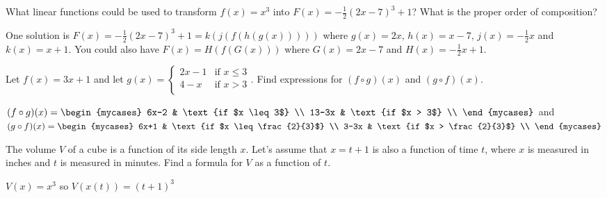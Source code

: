 \documentclass{ximera}
\begin{document}
\begin{problem}
What linear functions could be used to transform $f(x) = x^{3}$ into $F(x) = -\frac{1}{2}(2x - 7)^{3} + 1$?  What is the proper order of composition?

\begin{solution}
One solution is $F(x) = -\frac{1}{2}(2x - 7)^{3} + 1 = k(j(f(h(g(x)))))$ where $g(x) = 2x, \, h(x) = x - 7, \, j(x) = -\frac{1}{2}x$ and $k(x) = x + 1$.  You could also have $F(x) = H(f(G(x)))$ where $G(x) = 2x - 7$ and $H(x) = -\frac{1}{2}x + 1$.

\end{solution}
\end{problem}

\begin{problem}
Let $f(x) = 3x+1$ and let $g(x) =    \begin{cases}  2x-1 &  \text{if $x \leq 3$} \\   4-x & \text{if $x > 3$} \\  \end{cases}$.  Find expressions for $(f \circ g)(x)$ and $(g \circ f)(x)$.

\begin{solution}
    $(f \circ g)(x) =    \begin{mycases} 6x-2 &  \text{if $x \leq 3$} \\   13-3x  & \text{if $x > 3$} \\  \end{mycases}$ and $(g \circ f)(x) =    \begin{mycases} 6x+1 &  \text{if $x \leq \frac{2}{3}$} \\   3-3x  & \text{if $x > \frac{2}{3}$} \\  \end{mycases}$
\end{solution}

\end{problem}

\begin{problem}
The volume $V$ of a cube is a function of its side length $x$.  Let's assume that $x = t + 1$ is also a function of time $t$, where $x$ is measured in inches and $t$ is measured in minutes.  Find a formula for $V$ as a function of $t$.

\begin{solution}
    $V(x) = x^{3}$ so $V(x(t)) = (t + 1)^{3}$
\end{solution}
\end{problem}
\end{document}
